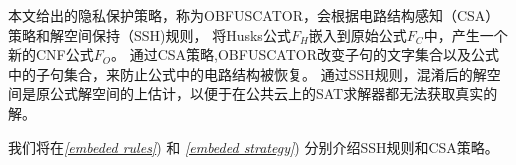%

本文给出的隐私保护策略，称为OBFUSCATOR，会根据电路结构感知（CSA）策略和解空间保持（SSH)规则，
将Husks公式$F_H$嵌入到原始公式$F_C$中，产生一个新的CNF公式$F_O$。
通过CSA策略,OBFUSCATOR改变子句的文字集合以及公式中的子句集合，来防止公式中的电路结构被恢复。
通过SSH规则，混淆后的解空间是原公式解空间的上估计，以便于在公共云上的SAT求解器都无法获取真实的解。

我们将在\textit{\ref{embeded rules}}) 和 \textit{\ref{embeded strategy}}) 分别介绍SSH规则和CSA策略。
